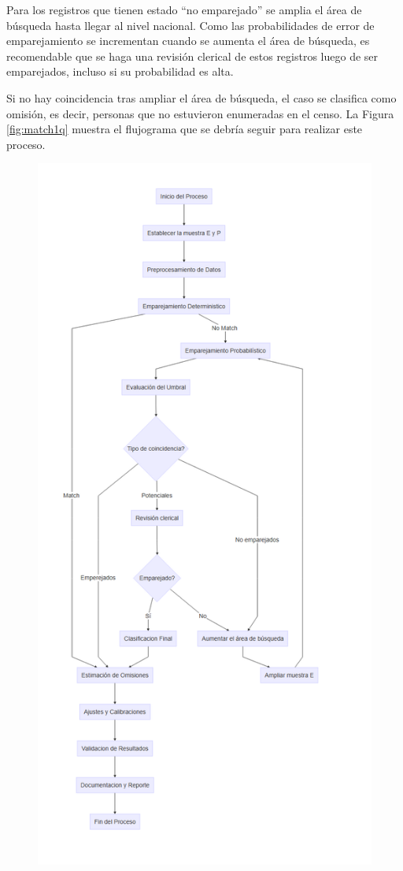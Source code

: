 \documentclass[
  12pt,
]{book}
\begin{document}
Para los registros que tienen estado ``no emparejado'' se amplia el área de búsqueda hasta llegar al nivel nacional. Como las probabilidades de error de emparejamiento se incrementan cuando se aumenta el área de búsqueda, es recomendable que se haga una revisión clerical de estos registros luego de ser emparejados, incluso si su probabilidad es alta.

Si no hay coincidencia tras ampliar el área de búsqueda, el caso se clasifica como omisión, es decir, personas que no estuvieron enumeradas en el censo. La Figura \ref{fig:match1q} muestra el flujograma que se debría seguir para realizar este proceso.

\begin{figure}

{\centering \includegraphics[width=1\linewidth]{images/grafo} 

}
\end{figure}
\end{document}

